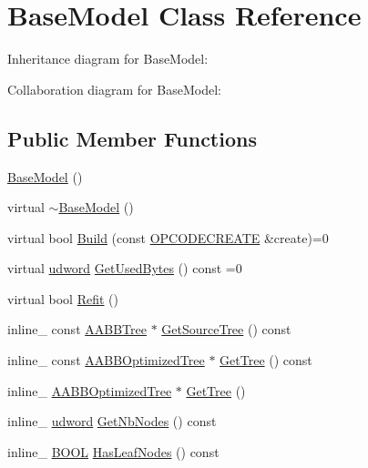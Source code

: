 \hypertarget{class_base_model}{\section{Base\+Model Class Reference}
\label{class_base_model}
}


Inheritance diagram for Base\+Model\+:


Collaboration diagram for Base\+Model\+:
\subsection*{Public Member Functions}
\begin{DoxyCompactItemize}
\item 
\hyperlink{class_base_model_a8e9c9d6d5ff39a7db2788affdd2c9de2}{Base\+Model} ()
\item 
virtual \hyperlink{class_base_model_a772199c091da3e8afc6a2715b564847c}{$\sim$\+Base\+Model} ()
\item 
virtual bool \hyperlink{class_base_model_ab2692ac2ec9c0c8c452d73f3a0bd341b}{Build} (const \hyperlink{struct_o_p_c_o_d_e_c_r_e_a_t_e}{O\+P\+C\+O\+D\+E\+C\+R\+E\+A\+T\+E} \&create)=0
\item 
virtual \hyperlink{_ice_types_8h_a44c6f1920ba5551225fb534f9d1a1733}{udword} \hyperlink{class_base_model_a714251e9cd861e4e304f5740c75a5b74}{Get\+Used\+Bytes} () const =0
\item 
virtual bool \hyperlink{class_base_model_a930a22828bbcab033ac73d2e2ead3ba4}{Refit} ()
\item 
inline\+\_\+ const \hyperlink{class_a_a_b_b_tree}{A\+A\+B\+B\+Tree} $\ast$ \hyperlink{class_base_model_a9a72077f4535987b8bcca9d8fd4322ff}{Get\+Source\+Tree} () const 
\item 
inline\+\_\+ const \hyperlink{class_a_a_b_b_optimized_tree}{A\+A\+B\+B\+Optimized\+Tree} $\ast$ \hyperlink{class_base_model_abc95fd0dde58d8c9468f6772c1e085f2}{Get\+Tree} () const 
\item 
inline\+\_\+ \hyperlink{class_a_a_b_b_optimized_tree}{A\+A\+B\+B\+Optimized\+Tree} $\ast$ \hyperlink{class_base_model_ac278bb341163cec3d71026f4e7f7f29e}{Get\+Tree} ()
\item 
inline\+\_\+ \hyperlink{_ice_types_8h_a44c6f1920ba5551225fb534f9d1a1733}{udword} \hyperlink{class_base_model_a511257faf2505c41f70c41ddee13a22d}{Get\+Nb\+Nodes} () const 
\item 
inline\+\_\+ \hyperlink{_ice_types_8h_a050c65e107f0c828f856a231f4b4e788}{B\+O\+O\+L} \hyperlink{class_base_model_a6e6e9719dd522561c1473997db74c260}{Has\+Leaf\+Nodes} () const 

\end{DoxyCompactItemize}
